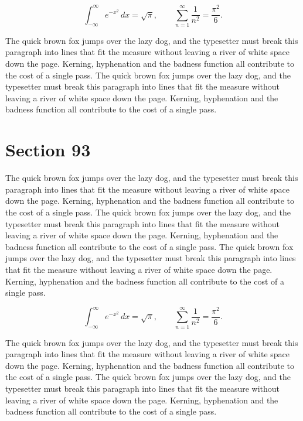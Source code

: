 \documentclass{article}
\begin{document}
\begin{equation}
\int_{-\infty}^{\infty} e^{-x^{2}}\,dx = \sqrt{\pi}, \qquad
\sum_{n=1}^{\infty} \frac{1}{n^{2}} = \frac{\pi^{2}}{6}.
\end{equation}

The quick brown fox jumps over the lazy dog, and the typesetter must break this paragraph into lines that fit the measure without leaving a river of white space down the page. Kerning, hyphenation and the badness function all contribute to the cost of a single pass. The quick brown fox jumps over the lazy dog, and the typesetter must break this paragraph into lines that fit the measure without leaving a river of white space down the page. Kerning, hyphenation and the badness function all contribute to the cost of a single pass. 
\section{Section 93}
The quick brown fox jumps over the lazy dog, and the typesetter must break this paragraph into lines that fit the measure without leaving a river of white space down the page. Kerning, hyphenation and the badness function all contribute to the cost of a single pass. The quick brown fox jumps over the lazy dog, and the typesetter must break this paragraph into lines that fit the measure without leaving a river of white space down the page. Kerning, hyphenation and the badness function all contribute to the cost of a single pass. The quick brown fox jumps over the lazy dog, and the typesetter must break this paragraph into lines that fit the measure without leaving a river of white space down the page. Kerning, hyphenation and the badness function all contribute to the cost of a single pass. 

\begin{equation}
\int_{-\infty}^{\infty} e^{-x^{2}}\,dx = \sqrt{\pi}, \qquad
\sum_{n=1}^{\infty} \frac{1}{n^{2}} = \frac{\pi^{2}}{6}.
\end{equation}

The quick brown fox jumps over the lazy dog, and the typesetter must break this paragraph into lines that fit the measure without leaving a river of white space down the page. Kerning, hyphenation and the badness function all contribute to the cost of a single pass. The quick brown fox jumps over the lazy dog, and the typesetter must break this paragraph into lines that fit the measure without leaving a river of white space down the page. Kerning, hyphenation and the badness function all contribute to the cost of a single pass. 
\end{document}
